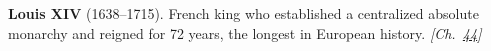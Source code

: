 \textbf{Louis XIV} (1638–1715). French king who established a centralized absolute monarchy and reigned for 72 years, the longest in European history. \emph{[Ch.~\hyperref[ch:ironmask]{44}]}


